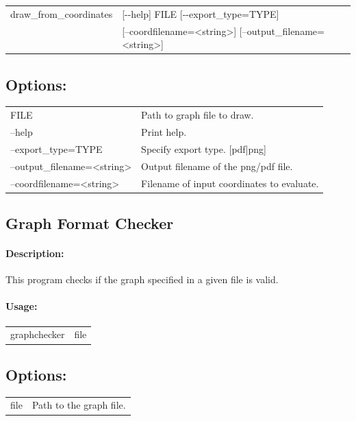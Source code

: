 \documentclass[11pt]{article}
\begin{document}
\begin{tabular}{ll}
 draw\_from\_coordinates&   [-{}-help] FILE [-{}-export\_type=TYPE]  \\
& [--coordfilename=<string>] [--output\_filename=<string>]



\end{tabular}
                          
\subsection*{Options:\\}

\begin{tabularx}{\textwidth}{lX}
  FILE                          & Path to graph file to draw.\\
  --help                        & Print help. \\
  --export\_type=TYPE           & Specify export type. [pdf|png]\\
  --output\_filename=<string>   & Output filename of the png/pdf file. \\
  --coordfilename=<string>      & Filename of input coordinates to evaluate. \\
\end{tabularx}

\vfill
\pagebreak
\vfill
\pagebreak
\subsection{Graph Format Checker}
\paragraph*{Description:} This program checks if the graph specified in a given file is valid. 
\paragraph*{Usage:\\} 
\begin{tabular}{ll}
graphchecker & file
\end{tabular}
\subsection*{Options:\\} 
\begin{tabularx}{\textwidth}{lX}
  file                       & Path to the graph file. \\
\end{tabularx}

\vfill
\pagebreak
\vfill
\pagebreak


\end{document}
